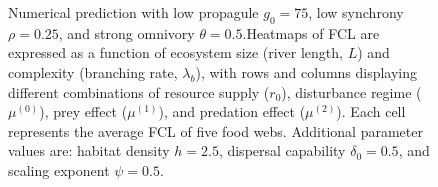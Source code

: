\begin{figure}
\centering
{}
\caption{\label{fig:fig-num5}Numerical prediction with low propagule
\(g_0 = 75\), low synchrony \(\rho = 0.25\), and strong omnivory
\(\theta = 0.5\).Heatmaps of FCL are expressed as a function of
ecosystem size (river length, \(L\)) and complexity (branching rate,
\(\lambda_b\)), with rows and columns displaying different combinations
of resource supply (\(r_0\)), disturbance regime (\(\mu^{(0)}\)), prey
effect (\(\mu^{(1)}\)), and predation effect (\(\mu^{(2)}\)). Each cell
represents the average FCL of five food webs. Additional parameter
values are: habitat density \(h=2.5\), dispersal capability
\(\delta_0=0.5\), and scaling exponent \(\psi=0.5\).}
\end{figure}

\newpage

